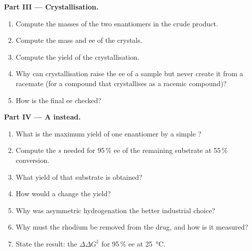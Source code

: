 \begin{problem}
\medskip\noindent\textbf{Part III --- Crystallisation.}
\begin{enumerate}[resume]
  \item Compute the masses of the two enantiomers in the crude product.
  \item Compute the mass and ee of the crystals.
  \item Compute the yield of the crystallisation.
  \item Why can crystallisation raise the ee of a sample but never create it from a
        racemate (for a compound that crystallises as a racemic compound)?
  \item How is the final ee checked?
\end{enumerate}

\medskip\noindent\textbf{Part IV --- A  instead.}
\begin{enumerate}[resume]
  \item What is the maximum yield of one enantiomer by a simple ?
  \item Compute the $s$ needed for 95\,\% ee of the remaining substrate at 55\,\% conversion.
  \item What yield of that substrate is obtained?
  \item How would a  change the yield?
  \item Why was asymmetric hydrogenation the better industrial choice?
  \item Why must the rhodium be removed from the drug, and how is it measured?
  \item State the result: the $\Delta\Delta G^\ddagger$ for 95\,\% ee at \qty{25}{\celsius}.
\end{enumerate}
\end{problem}
